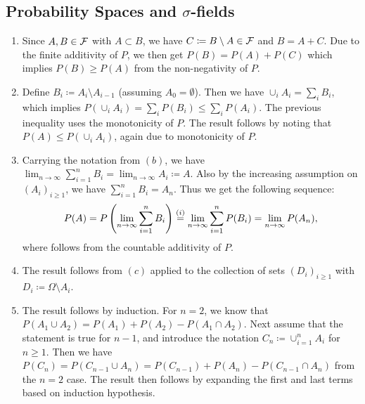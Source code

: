 \subsection{Probability Spaces and \texorpdfstring{$\sigma$}{s}-fields}
\begin{enumerate}[label=(\alph*)]
\item Since $A, B \in \mathcal{F}$ with $A \subset B$, we have $C \coloneqq B \setminus A \in \mathcal{F}$ and $B = A + C$. Due to the finite additivity of $P$, we then get $P(B) = P(A) + P(C)$ which implies $P(B) \geq P(A)$ from the non-negativity of $P$. 

\item Define $B_i \coloneqq A_i \setminus A_{i-1}$ (assuming $A_0 = \emptyset$). Then we have $\cup_i A_i = \sum_i B_i$, which implies $P(\cup_iA_i) = \sum_i P(B_i) \leq \sum_i P(A_i)$. The previous inequality uses the monotonicity of $P$. The result follows by noting that $P(A) \leq P(\cup_iA_i)$, again due to monotonicity of $P$. 

\item Carrying the notation from $(b)$, we have $\lim_{n \to \infty} \sum_{i=1}^n B_i = \lim_{n \to \infty} A_i \coloneqq A$. Also by the increasing assumption on $(A_i)_{i \geq 1}$, we have $\sum_{i=1}^n B_i = A_n$. Thus we get the following sequence:
\begin{align*}
    P(A) = P\left (\lim_{n\to\infty} \sum_{i=1}^n B_i \right ) \stackrel{(i)}{=} \lim_{n \to \infty} \sum_{i=1}^{n} P(B_i) = \lim_{n \to \infty} P(A_n), 
\end{align*}
where  follows from the countable additivity of $P$. 

\item The result follows from $(c)$ applied to the collection of sets $(D_i)_{i \geq 1}$ with $D_i \coloneqq \Omega \setminus A_i$. 

\item The result follows by induction. For $n=2$, we know that $P(A_1 \cup A_2) = P(A_1) + P(A_2) - P(A_1 \cap A_2)$. Next assume that the statement is true for $n-1$, and introduce the notation $C_n \coloneqq \cup_{i=1}^n A_i$ for $n \geq 1$. Then we have $P(C_n) = P(C_{n-1} \cup A_n) = P(C_{n-1}) + P(A_n) - P(C_{n-1}\cap A_n)$ from the $n=2$ case. The result then follows by expanding the first and last terms based on induction hypothesis. 
\end{enumerate}

